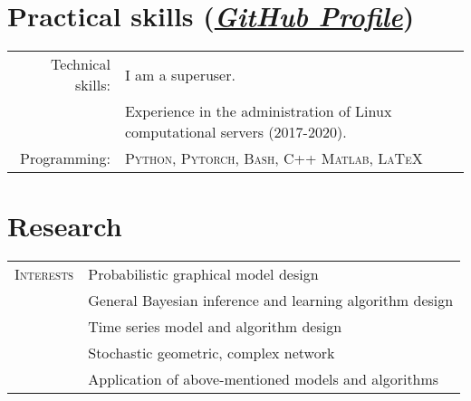 \documentclass[a4paper,10pt]{article}
\begin{document}

\section{Practical skills (\href{https://github.com/FirstHandScientist}{\textit{GitHub Profile}})}

\begin{tabular}{rp{12cm}}
	Technical skills:  & I am a superuser. \\
                     & Experience in the administration of Linux computational servers (2017-2020).
                       \vspace{5pt}\\
	Programming:       & \textsc{Python, Pytorch, Bash, C++ Matlab, \LaTeX}  \vspace{5pt}\\
\end{tabular}

\section{Research}
\begin{tabular}{r|p{13cm}}
\textsc{Interests} & Probabilistic graphical model design \\
& General Bayesian inference and learning algorithm design \\%
& Time series model and algorithm design\\
& Stochastic geometric, complex network\\
& Application of above-mentioned models and algorithms
\end{tabular}

\end{document}
